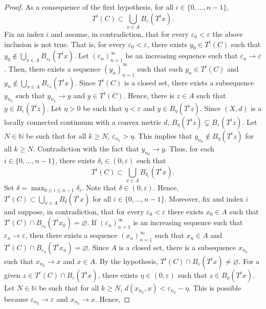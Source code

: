 \documentclass[sn-mathphys-num]{sn-jnl}%
\theoremstyle{thmstyleone}%
\theoremstyle{thmstyletwo}%
\theoremstyle{thmstylethree}%
\begin{document}
\begin{proof}
    As a consequence of the first hypothesis, for all $i \in \{0, ..., n - 1\}$,
    \begin{equation*}
        T^i(C) \subset \bigcup\limits_{x \in A} B_\varepsilon(T^ix).
    \end{equation*}
    Fix an index $i$ and assume, in contradiction, that for every $\varepsilon_0 < \varepsilon$ the above inclusion is not true. That is, for every $\varepsilon_0 < \varepsilon$, there exists $y_0 \in T^i(C)$ such that $y_0 \notin \bigcup_{x \in A} B_{\varepsilon_0}(T^ix)$. Let $(\varepsilon_n)_{n = 1}^\infty$ be an increasing sequence such that $\varepsilon_n \to \varepsilon$. Then, there exists a sequence $(y_n)_{n = 1}^\infty$ such that each $y_n \in T^i(C)$ and $y_n \notin \bigcup_{x \in A} B_{\varepsilon_n}(T^ix)$. Since $T^i(C)$ is a closed set, there exists a subsequence $y_{n_k}$ such that $y_{n_k} \to y$ and $y \in T^i(C)$. Hence, there is $z \in A$ such that $y \in B_\varepsilon(T^iz)$. Let $\eta > 0$ be such that $\eta < \varepsilon$ and $y \in B_\eta(T^iz)$. Since $(X, d)$ is a locally connected continuum with a convex metric $d$, $B_\eta(T^iz) \subsetneq B_\varepsilon(T^iz)$. Let $N \in \mathbb{N}$ be such that for all $k \geq N$, $\varepsilon_{n_k} > \eta$. This implies that $y_{n_k} \notin B_\eta(T^iz)$ for all $k \geq N$. Contradiction with the fact that $y_{n_k} \to y$. Thus, for each $i \in \{0, ..., n-1\}$, there exists $\delta_i \in (0, \varepsilon)$ such that
    \begin{equation*}
        T^i(C) \subset \bigcup\limits_{x \in A} B_{\delta_i}(T^ix).
    \end{equation*}
    Set $\delta = \max_{0 \leq i \leq n - 1} \delta_i$. Note that $\delta \in (0, \varepsilon)$. Hence, $T^i(C) \subset \bigcup_{x \in A} B_\delta(T^ix)$ for all $i \in \{0, ..., n - 1\}$. Moreover, fix and index $i$ and suppose, in contradiction, that for every $\varepsilon_0 < \varepsilon$ there exists $x_0 \in A$ such that $T^i(C) \cap B_{\varepsilon_0}(T^ix_0) = \varnothing$. If $(\varepsilon_n)_{n = 1}^\infty$ is an increasing sequence such that $\varepsilon_n \to \varepsilon$, then there exists a sequence $(x_n)_{n = 1}^\infty$ such that $x_n \in A$ and $T^i(C) \cap B_{\varepsilon_n}(T^ix_n) = \varnothing$. Since $A$ is a closed set, there is a subsequence $x_{n_k}$ such that $x_{n_k} \to x$ and $x \in A$. By the hypothesis, $T^i(C) \cap B_\varepsilon(T^ix) \neq \varnothing$. For a given $z \in T^i(C) \cap B_\varepsilon(T^ix)$, there exists $\eta \in (0, \varepsilon)$ such that $z \in B_\eta(T^ix)$. Let $N \in \mathbb{N}$ be such that for all $k \geq N$, $d(x_{n_k}, x) < \varepsilon_{n_k} - \eta$. This is possible because $\varepsilon_{n_k} \to \varepsilon$ and $x_{n_k} \to x$. Hence, 

\end{proof}
\end{document}
